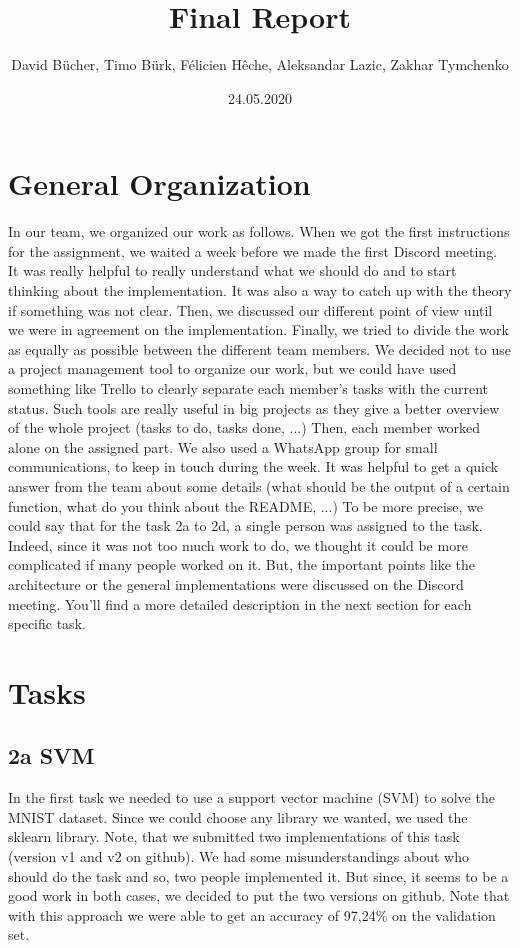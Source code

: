 \documentclass[12pt]{article}
\begin{document}
\title{Final Report}
\author{David Bücher, Timo Bürk, Félicien Hêche, Aleksandar Lazic, Zakhar Tymchenko }
\date{24.05.2020}
\maketitle


\section*{General Organization}
In our team, we organized our work as follows.
\newline When we got the first instructions for the assignment, we waited a week before we made the first Discord meeting. It was really helpful to really understand what we should do and to start thinking about the implementation. It was also a way to catch up with the theory if something was not clear. Then, we discussed our different point of view until we were in agreement on the implementation. Finally, we tried to divide the work as equally as possible between the different team members.
\newline We decided not to use a project management tool to organize our work, but we could have used something like Trello to clearly separate each member's tasks with the current status. Such tools are really useful in big projects as they give a better overview of the whole project (tasks to do, tasks done, ...)
\newline Then, each member worked alone on the assigned part. We also used a WhatsApp group for small communications, to keep in touch during the week. It was helpful to get a quick answer from the team about some details (what should be the output of a certain function, what do you think about the README, ...)
\newline  To be more precise, we could say that for the task 2a to 2d, a single person was assigned to the task. Indeed, since it was not too much work to do, we thought it could be more complicated if many people worked on it. But, the important points like the architecture or the general implementations were discussed on the Discord meeting. You'll find a more detailed description in the next section for each specific task.
\section*{Tasks}
\subsection*{2a SVM}
In the first task we needed to use a support vector machine (SVM) to solve the MNIST dataset. Since we could choose any library we wanted, we used the sklearn library. Note, that we submitted two implementations of this task (version v1 and v2 on github). We had some misunderstandings about who should do the task and so, two people implemented it. But since, it seems to be a good work in both cases, we decided to put the two versions on github. Note that with this approach we were able to get an accuracy of 97,24\% on the validation set.
\end{document}
